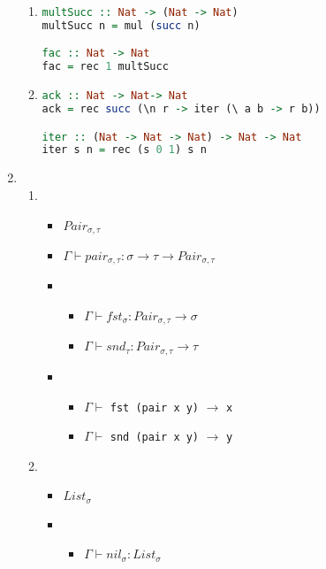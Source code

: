 \documentclass[12pt,a4paper]{article}
\begin{document}
\begin{enumerate}
{\begin{enumerate}
{\begin{lstlisting}[language=Haskell]
isZero :: Nat -> Bool -> Bool
isZero n _ = rec True false n

ge :: Nat -> Nat -> Bool
ge n m = rec True isZero (minus m n)
			\end{lstlisting}
		}
		\item {
			\begin{lstlisting}[language=Haskell]
multSucc :: Nat -> (Nat -> Nat)
multSucc n = mul (succ n)

fac :: Nat -> Nat
fac = rec 1 multSucc
			\end{lstlisting}
		}
		\item {
			\begin{lstlisting}[language=Haskell]
ack :: Nat -> Nat-> Nat
ack = rec succ (\n r -> iter (\ a b -> r b))

iter :: (Nat -> Nat -> Nat) -> Nat -> Nat
iter s n = rec (s 0 1) s n
			\end{lstlisting}
		}
	\end{enumerate}
}
\item {
	\begin{enumerate}
	\item {
		\begin{itemize}
			\item $Pair_{\sigma,\tau}$
			\item $\Gamma \vdash pair_{\sigma,\tau} \colon \sigma \rightarrow \tau \rightarrow Pair_{\sigma,\tau}$
			\item {
				\begin{itemize}
					\item $\Gamma \vdash fst_{\sigma} \colon Pair_{\sigma,\tau} \rightarrow \sigma$
					\item $\Gamma \vdash snd_{\tau} \colon Pair_{\sigma,\tau} \rightarrow \tau$
				\end{itemize}
			}
			\item {
				\begin{itemize}
					\item $\Gamma \vdash$ \texttt{fst (pair x y)} $\rightarrow$ \texttt{x}
					\item $\Gamma \vdash$ \texttt{snd (pair x y)} $\rightarrow$ \texttt{y}
				\end{itemize}
			}
		\end{itemize}
	}
	\item {
		\begin{itemize}
			\item $List_{\sigma}$
			\item {
				\begin{itemize}
					\item $\Gamma \vdash nil_{\sigma} \colon List_{\sigma}$

\end{itemize}}
\end{itemize}}
\end{enumerate}}
\end{enumerate}
\end{document}
